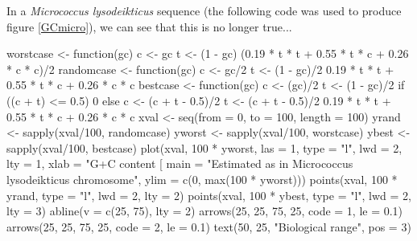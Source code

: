 \documentclass{article}
\begin{document}
\begin{figure}
\centering{}
\end{figure}


In a \textit{Micrococcus lysodeikticus} sequence (the following code
was used to produce figure \ref{GCmicro}), we can see that this 
is no longer true...

\begin{Schunk}
\begin{Sinput}
 worstcase <- function(gc) {
     c <- gc
     t <- (1 - gc)
     (0.19 * t * t + 0.55 * t * c + 0.26 * c * c)/2
 }
 randomcase <- function(gc) {
     c <- gc/2
     t <- (1 - gc)/2
     0.19 * t * t + 0.55 * t * c + 0.26 * c * c
 }
 bestcase <- function(gc) {
     c <- (gc)/2
     t <- (1 - gc)/2
     if ((c + t) <= 0.5) {
         0
     }
     else {
         c <- (c + t - 0.5)/2
         t <- (c + t - 0.5)/2
         0.19 * t * t + 0.55 * t * c + 0.26 * c * c
     }
 }
 xval <- seq(from = 0, to = 100, length = 100)
 yrand <- sapply(xval/100, randomcase)
 yworst <- sapply(xval/100, worstcase)
 ybest <- sapply(xval/100, bestcase)
 plot(xval, 100 * yworst, las = 1, type = "l", lwd = 2, lty = 1, 
     xlab = "G+C content [%
     main = "Estimated as in Micrococcus lysodeikticus chromosome", 
     ylim = c(0, max(100 * yworst)))
 points(xval, 100 * yrand, type = "l", lwd = 2, lty = 2)
 points(xval, 100 * ybest, type = "l", lwd = 2, lty = 3)
 abline(v = c(25, 75), lty = 2)
 arrows(25, 25, 75, 25, code = 1, le = 0.1)
 arrows(25, 25, 75, 25, code = 2, le = 0.1)
 text(50, 25, "Biological range", pos = 3)
\end{Sinput}
\end{Schunk}
\end{document}
